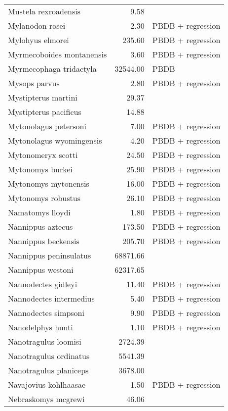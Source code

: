 \begin{table}[ht]
\begin{tabular}{lrl}
  Mustela rexroadensis & 9.58 & \cite{Tomiya2013} \\ 
  Mylanodon rosei & 2.30 & PBDB + regression \\ 
  Mylohyus elmorei & 235.60 & PBDB + regression \\ 
  Myrmecoboides montanensis & 3.60 & PBDB + regression \\ 
  Myrmecophaga tridactyla & 32544.00 & PBDB \\ 
  Mysops parvus & 2.80 & PBDB + regression \\ 
  Mystipterus martini & 29.37 & \cite{Tomiya2013} \\ 
  Mystipterus pacificus & 14.88 & \cite{Tomiya2013} \\ 
  Mytonolagus petersoni & 7.00 & PBDB + regression \\ 
  Mytonolagus wyomingensis & 4.20 & PBDB + regression \\ 
  Mytonomeryx scotti & 24.50 & PBDB + regression \\ 
  Mytonomys burkei & 25.90 & PBDB + regression \\ 
  Mytonomys mytonensis & 16.00 & PBDB + regression \\ 
  Mytonomys robustus & 26.10 & PBDB + regression \\ 
  Namatomys lloydi & 1.80 & PBDB + regression \\ 
  Nannippus aztecus & 173.50 & PBDB + regression \\ 
  Nannippus beckensis & 205.70 & PBDB + regression \\ 
  Nannippus peninsulatus & 68871.66 & \cite{Tomiya2013} \\ 
  Nannippus westoni & 62317.65 & \cite{Tomiya2013} \\ 
  Nannodectes gidleyi & 11.40 & PBDB + regression \\ 
  Nannodectes intermedius & 5.40 & PBDB + regression \\ 
  Nannodectes simpsoni & 9.90 & PBDB + regression \\ 
  Nanodelphys hunti & 1.10 & PBDB + regression \\ 
  Nanotragulus loomisi & 2724.39 & \cite{Tomiya2013} \\ 
  Nanotragulus ordinatus & 5541.39 & \cite{Tomiya2013} \\ 
  Nanotragulus planiceps & 3678.00 & \cite{McKenna2011} \\ 
  Navajovius kohlhaasae & 1.50 & PBDB + regression \\ 
  Nebraskomys mcgrewi & 46.06 & \cite{Tomiya2013} \\ 

\end{tabular}
\end{table}
